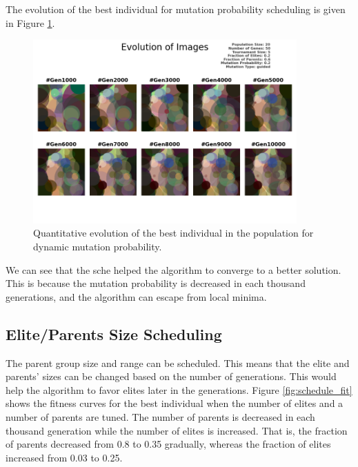 \documentclass{assignment}
\begin{document}
The evolution of the best individual for mutation probability scheduling is given in Figure \ref{fig:dynamic_mutation_image}.

\begin{figure}[!htb]
    \centering
    \includegraphics[width=0.9\textwidth]{figures/images_outputPROB_20_50_5_0.2_0.6_0.2_guided.png}
    \caption{Quantitative evolution of the best individual in the population for dynamic mutation probability.}
    \label{fig:dynamic_mutation_image}
\end{figure}
We can see that the sche helped the algorithm to converge to a better solution. This is because the mutation probability is decreased in each thousand generations, and the algorithm can escape from local minima.

\subsection{Elite/Parents Size Scheduling}

The parent group size and range can be scheduled. This means that the elite and parents' sizes can be changed based on the number of generations. This would help the algorithm to favor elites later in the generations. Figure \ref{fig:schedule_fit} shows the fitness curves for the best individual when the number of elites and a number of parents are tuned. The number of parents is decreased in each thousand generation while the number of elites is increased. That is, the fraction of parents decreased from 0.8 to 0.35 gradually, whereas the fraction of elites increased from 0.03 to 0.25.
\end{document}
